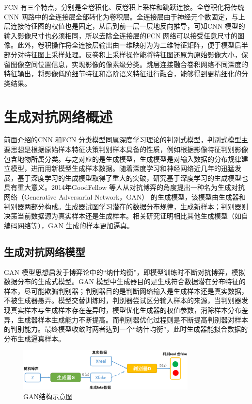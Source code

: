 FCN 有三个特点，分别是全卷积化、反卷积上采样和跳跃连接。全卷积化将传统CNN 网路中的全连接层全部转化为卷积层。全连接层由于神经元个数固定，与上层连接特征图的权值也是固定，从后到前一层一层地反向推导，可知CNN 模型的输入影像尺寸也必须相同，所以去除全连接层的FCN 网络可以接受任意尺寸的图像。此外，卷积操作将全连接层输出由一维映射为为二维特征矩阵，便于模型后半部分对特征图上采样处理。反卷积上采样操作能将特征图还原为原始影像大小，保留图像空间位置信息，实现影像的像素级分类。跳层连接融合卷积网络不同深度的特征输出，将影像低阶细节特征和高阶语义特征进行融合，能够得到更精细化的分类结果。

\section{生成对抗网络概述}
\label{sec:chap02-3}
前面介绍的CNN 和FCN 分类模型同属深度学习理论的判别式模型，判别式模型主要思想是根据原始样本特征决策判别样本具备的性质，例如根据影像特征判别影像包含地物所属分类。与之对应的是生成模型，生成模型是对输入数据的分布规律建立模型，进而用新模型生成样本数据。随着深度学习和神经网络近几年的迅猛发展，基于深度学习的生成模型取得了重大的突破，研究基于深度学习的生成模型也具有重大意义。2014年GoodFellow 等人从对抗博弈的角度提出一种名为生成对抗网络（Generative Adversarial Network，GAN）\cite{goodfellow2014generative} 的生成模型，该模型由生成器和判别器两部分构成。生成器试图学习潜在的数据分布规律，生成新样本；判别器则决策当前数据源为真实样本还是生成样本。相关研究\cite{mirza2014conditional}证明相比其他生成模型（如自编码网络等），GAN 生成的样本更加逼真。 

\subsection{生成对抗网络模型}
\label{sec:first-1}
GAN 模型思想启发于博弈论中的“纳什均衡”，即模型训练时不断对抗博弈，模拟数据分布的生成式模型。GAN 模型中生成器目的是生成符合数据潜在分布特征的样本，尽可能欺骗判别器；判别器目的是判断网络输入是生成样本还是真实数据，不被生成器愚弄。模型交替训练时，判别器尝试区分输入样本的来源，当判别器发现真实样本与生成样本存在差异时，模型优化生成器的权值参数，消除样本分布差异，生成器样本生成能力不断提高。而判别器优化过程则是不断提高判别器对样本的判别能力。最终模型收敛时两者达到一个“纳什均衡”，此时生成器能拟合数据的分布生成逼真样本。

\begin{figure}[htb]
  \centering
  \includegraphics[width=0.8\textwidth]{figures/gan}
  \caption{GAN结构示意图}\label{fig:gan}
\end{figure}

